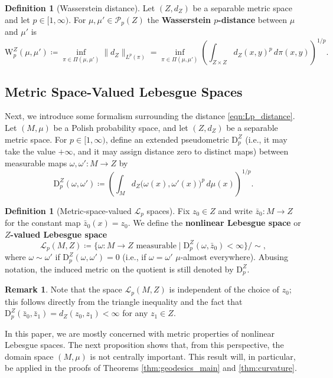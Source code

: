 \documentclass{article}
\theoremstyle{definition}
\newtheorem{definition}[proposition]{Definition}
\newtheorem{remark}[proposition]{Remark}
\newcommand{\WZ}{\mathcal{P}_p(Z)}
\newcommand{\wz}{\mathrm{W}_p^Z}
\newcommand{\Lp}{\mathcal{L}_p}
\newcommand{\dpz}{\mathrm{D}^Z_p}
\begin{document}
\begin{definition}[Wasserstein distance]\label{def:wasserstein}
Let $(Z,d_Z)$ be a separable metric space and let $p\in[1,\infty)$.
For $\mu,\mu'\in\WZ$ the \textbf{Wasserstein $p$-distance} between $\mu$ and $\mu'$ is
\[
\wz(\mu,\mu')
\coloneqq \inf_{\pi \in \Pi(\mu,\mu')} \|d_Z\|_{L^p(\pi)} = \inf_{\pi\in\Pi(\mu,\mu')} \left(\displaystyle\int_{Z\times Z} d_Z(x,y)^p\,d\pi(x,y)\right)^{1/p}.
\]
\end{definition}

\subsection{Metric Space-Valued Lebesgue Spaces}

Next, we introduce some formalism surrounding the distance \eqref{eqn:Lp_distance}. Let $(M,\mu)$ be a Polish probability space, and let $(Z,d_Z)$ be a separable metric space.
For $p \in [1,\infty)$, define an extended pseudometric $\dpz$ (i.e., it may take the value $+\infty$, and it may assign distance zero to distinct maps)  between measurable maps $\omega,\omega':M \to Z$ by
\[
\dpz(\omega,\omega') \coloneqq \left(\int_{M} d_Z\bigl(\omega(x),\omega'(x)\bigr)^p\,d\mu(x)\right)^{1/p}.
\]

\begin{definition}[Metric-space-valued $\Lp$ spaces]\label{def:Lp}
Fix $z_0\in Z$ and write $\bar z_0:M\to Z$ for the constant map $\bar z_0(x)=z_0$.
We define the \textbf{nonlinear Lebesgue space} or \textbf{$Z$-valued Lebesgue space}
\[
\Lp(M,Z)\coloneqq\{\omega:M\to Z\text{ measurable}\mid \dpz(\omega,\bar z_0)<\infty\}/\!\sim,
\]
where $\omega\sim\omega'$ if $\dpz(\omega,\omega')=0$ (i.e., if $\omega = \omega'$ $\mu$-almost everywhere).
Abusing notation, the induced metric on the quotient is still denoted by $\dpz$. 
\end{definition}

\begin{remark}
    Note that the space $\Lp(M,Z)$ is independent of the choice of $z_0$; this follows directly from the triangle inequality and the fact that $\dpz(\bar z_0,\bar z_1) = d_Z(z_0,z_1) <\infty$ for any $z_1\in Z$.
\end{remark}

In this paper, we are mostly concerned with metric properties of nonlinear Lebesgue spaces. The next proposition shows that, from this perspective, the domain space $(M,\mu)$ is not centrally important. This result will, in particular, be applied in the proofs of Theorems \ref{thm:geodesics_main} and \ref{thm:curvature}.
\end{document}
